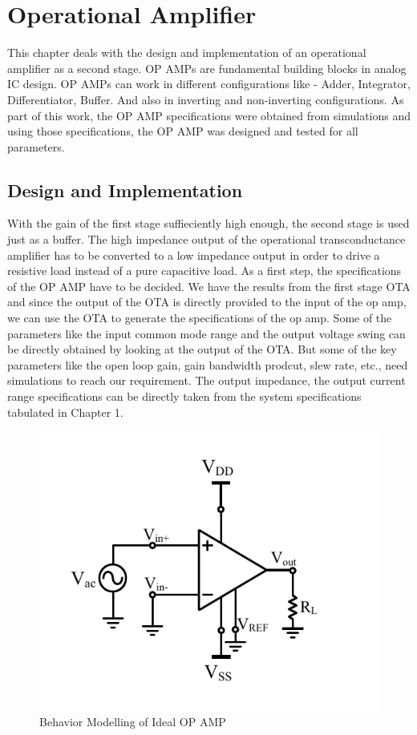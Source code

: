 \chapter{Operational Amplifier}
This chapter deals with the design and implementation of an operational amplifier as a second stage. OP AMPs are fundamental building blocks in analog IC design. OP AMPs can work in different configurations like - Adder, Integrator, Differentiator, Buffer. And also in inverting and non-inverting configurations. As part of this work, the OP AMP specifications were obtained from simulations and using those specifications, the OP AMP was designed and tested for all parameters.
 
\section{Design and Implementation}
With the gain of the first stage suffieciently high enough, the second stage is used just as a buffer. The high impedance output of the operational transconductance amplifier has to be converted to a low impedance output in order to drive a resistive load instead of a pure capacitive load. As a first step, the specifications of the OP AMP have to be decided. We have the results from the first stage OTA and since the output of the OTA is directly provided to the input of the op amp, we can use the OTA to generate the specifications of the op amp. Some of the parameters like the input common mode range and the output voltage swing can be directly obtained by looking at the output of the OTA. But some of the key parameters like the open loop gain, gain bandwidth prodcut, slew rate, etc., need simulations to reach our requirement. The output impedance, the output current range specifications can be directly taken from the system specifications tabulated in Chapter 1.

\begin{figure} [H]
\centering
\includegraphics[scale=1]{Figures/System_Level/ahdl_OPAMP.pdf}
\caption{Behavior Modelling of Ideal OP AMP}
\label{fig:ahdlopamp}
\end{figure}

